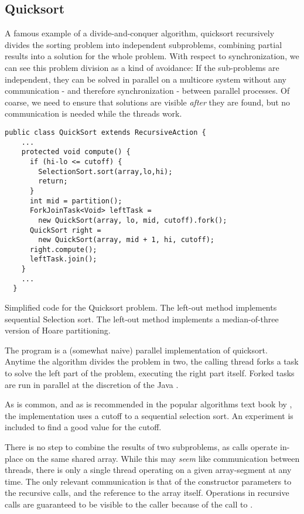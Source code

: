 \subsection{Quicksort}
A famous example of a divide-and-conquer algorithm, quicksort recursively
divides the sorting problem into independent subproblems, combining partial
results into a solution for the whole problem. With respect to synchronization,
we can see this problem division as a kind of avoidance: If the sub-problems are
independent, they can be solved in parallel on a multicore system without any
communication - and therefore synchronization - between parallel processes.
Of coarse, we need to ensure that solutions are visible \textit{after} they are
found, but no communication is needed while the threads work.

\begin{code}
\begin{Verbatim}[frame=single]
  public class QuickSort extends RecursiveAction {
    ...
    protected void compute() {
      if (hi-lo <= cutoff) {
        SelectionSort.sort(array,lo,hi);
        return;
      }
      int mid = partition();
      ForkJoinTask<Void> leftTask =
        new QuickSort(array, lo, mid, cutoff).fork();
      QuickSort right =
        new QuickSort(array, mid + 1, hi, cutoff);
      right.compute();
      leftTask.join();
    }
    ...
  }
\end{Verbatim}
	\caption{Simplified code for the Quicksort problem. The left-out
	 method implements sequential Selection sort.
	The left-out  method implements a median-of-three
	version of Hoare partitioning.}
\end{code}

The program is a (somewhat naive) parallel implementation of quicksort. Anytime
the algorithm divides the problem in two, the calling thread forks a task to
solve the left part of the problem, executing the right part itself. Forked
tasks are run in parallel at the discretion of the Java .

As is common, and as is recommended in the popular algorithms text book by
\citet{sedgewick}, the implementation uses a cutoff to a sequential selection
sort. An experiment is included to find a good value for the cutoff.

There is no step to combine the results of two subproblems, as calls operate
in-place on the same shared array. While this may \textit{seem} like communication
between threads, there is only a single thread operating on a given
array-segment at any time. The only relevant communication is that of the
constructor parameters to the recursive calls, and the reference to the array
itself. Operations in
recursive calls are guaranteed to be visible to the caller because of the
call to .

